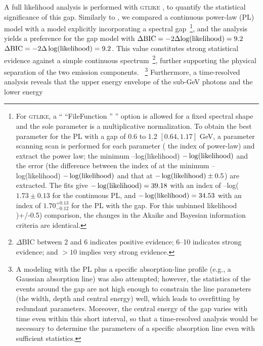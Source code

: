 \documentclass[prd,twocolumn,amsmath,amssymb,aps,linenumbers]{revtex4-2} %
\providecommand{\DIFaddtex}[1]{{\protect\color{blue} \sf #1}} %
\providecommand{\DIFdeltex}[1]{{\protect\color{red} \scriptsize #1}} %
\providecommand{\DIFaddbegin}{} %
\providecommand{\DIFaddend}{} %
\providecommand{\DIFdelbegin}{} %
\providecommand{\DIFdelend}{} %
\providecommand{\DIFadd}[1]{\texorpdfstring{\DIFaddtex{#1}}{#1}} %
\providecommand{\DIFdel}[1]{\texorpdfstring{\DIFdeltex{#1}}{}} %
\newcommand{\DIFscaledelfig}{0.5}
\newlength{\DIFdelgraphicswidth} %
\newlength{\DIFdelgraphicsheight} %
\newcommand{\DIFaddincludegraphics}[2][]{{\color{blue}\fbox{\DIFOincludegraphics[#1]{#2}}}} %
\newcommand{\DIFdelincludegraphics}[2][]{%
\sbox{\DIFdelgraphicsbox}{\DIFOincludegraphics[#1]{#2}}%
\settoboxwidth{\DIFdelgraphicswidth}{\DIFdelgraphicsbox} %
\settoboxtotalheight{\DIFdelgraphicsheight}{\DIFdelgraphicsbox} %
\scalebox{\DIFscaledelfig}{%
\parbox[b]{\DIFdelgraphicswidth}{\usebox{\DIFdelgraphicsbox}\\[-\baselineskip] \rule{\DIFdelgraphicswidth}{0em}}\llap{\resizebox{\DIFdelgraphicswidth}{\DIFdelgraphicsheight}{%
\setlength{\unitlength}{\DIFdelgraphicswidth}%
\begin{picture}(1,1)%
\thicklines\linethickness{2pt} %
{\color[rgb]{1,0,0}\put(0,0){\framebox(1,1){}}}%
{\color[rgb]{1,0,0}\put(0,0){\line( 1,1){1}}}%
{\color[rgb]{1,0,0}\put(0,1){\line(1,-1){1}}}%
\end{picture}%
}\hspace*{3pt}}} %
} %
\DeclareRobustCommand{\DIFaddbegin}{\DIFOaddbegin \let\includegraphics\DIFaddincludegraphics} %
\DeclareRobustCommand{\DIFaddend}{\DIFOaddend \let\includegraphics\DIFOincludegraphics} %
\DeclareRobustCommand{\DIFdelbegin}{\DIFOdelbegin \let\includegraphics\DIFdelincludegraphics} %
\DeclareRobustCommand{\DIFdelend}{\DIFOaddend \let\includegraphics\DIFOincludegraphics} %
\begin{document}
A full likelihood analysis is performed with \textsc{gtlike} \DIFdelbegin \DIFdel{, }\DIFdelend to quantify the statistical significance of this gap. Similarly to \cite{2016MNRAS.463.1144W}, we compared a continuous power-law (PL) model with a model explicitly incorporating a spectral gap~\footnote{For \textsc{gtlike}, a \DIFdelbegin \DIFdel{“}\DIFdelend \DIFaddbegin \DIFadd{``}\DIFaddend FileFunction\DIFdelbegin \DIFdel{” }\DIFdelend \DIFaddbegin \DIFadd{'' }\DIFaddend option is allowed for \DIFaddbegin \DIFadd{a }\DIFaddend fixed spectral shape and the sole parameter is a multiplicative normalization. To obtain the best parameter for \DIFaddbegin \DIFadd{the }\DIFaddend PL with a gap of \DIFdelbegin \DIFdel{0.6 to 1.2 }\DIFdelend \DIFaddbegin \DIFadd{$[0.64, 1.17]$ }\DIFaddend GeV, a parameter \DIFdelbegin \DIFdel{scanning }\DIFdelend \DIFaddbegin \DIFadd{scan }\DIFaddend is performed for \DIFdelbegin \DIFdel{each parameter (}\DIFdelend \DIFaddbegin \DIFadd{the }\DIFaddend index of \DIFdelbegin \DIFdel{power-law) and extract }\DIFdelend \DIFaddbegin \DIFadd{the power law; }\DIFaddend the minimum \DIFdelbegin \DIFdel{–log(likelihood) }\DIFdelend \DIFaddbegin \DIFadd{$-\log(\rm likelihood)$ }\DIFaddend and the error (the difference between \DIFaddbegin \DIFadd{the }\DIFaddend index \DIFdelbegin \DIFdel{of }\DIFdelend \DIFaddbegin \DIFadd{at }\DIFaddend the minimum \DIFdelbegin \DIFdel{–log(likelihood) }\DIFdelend \DIFaddbegin \DIFadd{$-\log(\rm likelihood)$ }\DIFaddend and that \DIFaddbegin \DIFadd{at $-\log({\rm likelihood})\pm0.5$) are extracted. The fits give $-\log({\rm likelihood})=39.18$ with an index }\DIFaddend of \DIFdelbegin \DIFdel{–log(}\DIFdelend \DIFaddbegin \DIFadd{$1.73\pm0.13$ for the continuous PL, and $-\log({\rm likelihood})=34.53$ with an index of $1.70^{+0.13}_{-0.12}$ for the PL with the gap. For this unbinned }\DIFaddend likelihood \DIFdelbegin \DIFdel{)+/-0.5)}\DIFdelend \DIFaddbegin \DIFadd{comparison, the changes in the Akaike and Bayesian information criteria are identical.}\DIFaddend }, and the analysis yields a preference for the gap model with \DIFdelbegin \DIFdel{$\Delta \mathrm{BIC=-2\Delta\rm{log(likelihood)}}=9.2$}\DIFdelend \DIFaddbegin \DIFadd{$\Delta \mathrm{BIC}=-2\Delta\log({\rm likelihood})=9.2$}\DIFaddend . This value constitutes strong statistical evidence against a simple continuous spectrum~\footnote{$\Delta \mathrm{BIC}$ between 2 and 6 indicates positive evidence; 6--10 indicates strong evidence; and $>10$ implies very strong evidence.}, further supporting the physical separation of the two emission components.\DIFaddbegin \DIFadd{~}\footnote{\DIFadd{A modeling with the PL plus a specific absorption-line profile (e.g., a Gaussian absorption line) was also attempted; however, the statistics of the events around the gap are not high enough to constrain the line parameters (the width, depth and central energy) well, which leads to overfitting by redundant parameters. Moreover, the central energy of the gap varies with time even within this short interval, so that a time-resolved analysis would be necessary to determine the parameters of a specific absorption line even with sufficient statistics.}} \DIFaddend Furthermore, a time-resolved analysis reveals that the upper energy envelope of the sub-GeV photons and the lower energy 
\end{document}
